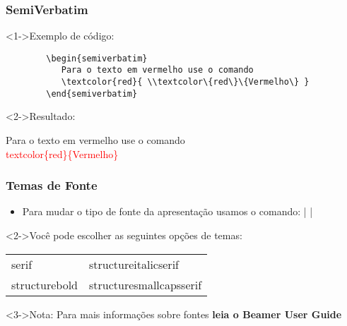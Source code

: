 
\begin{frame}[fragile]
  \frametitle{SemiVerbatim}

  \begin{block}<1->{Exemplo de código:}
     \begin{verbatim}
        \begin{semiverbatim}
           Para o texto em vermelho use o comando
           \textcolor{red}{ \\textcolor\{red\}\{Vermelho\} }
        \end{semiverbatim}
     \end{verbatim}
  \end{block}

  \begin{block}<2->{Resultado:}
    \begin{semiverbatim}
      Para o texto em vermelho use o comando
      \textcolor{red}{ \\textcolor\{red\}\{Vermelho\}}
    \end{semiverbatim}
  \end{block}
\end{frame}


\begin{frame}[fragile]
  \frametitle{Temas de Fonte}
  \begin{itemize}
     \item<1-> Para mudar o tipo de fonte da apresentação usamos o comando:
        | |
  \end{itemize}

  \begin{block}<2->{Você pode escolher as seguintes opções de temas:}
    \begin{center}
       \begin{tabular}{ll}
        serif & structureitalicserif \\
        structurebold & structuresmallcapsserif
      \end{tabular}
     \end{center}
  \end{block}

  \begin{block}<3->{Nota:}
    Para mais informações sobre fontes \textbf{leia o Beamer User Guide}
  \end{block}

\end{frame}

